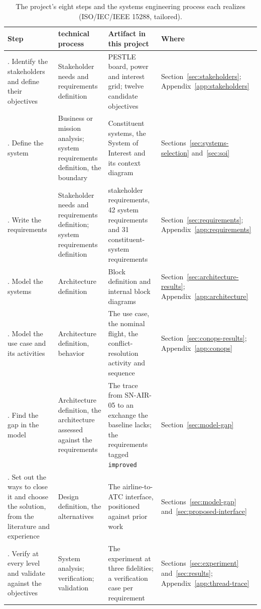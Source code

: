 \begin{table}[htbp]
\centering
\footnotesize
\renewcommand{\arraystretch}{1.25}
\caption{The project's eight steps and the systems engineering process each realizes (ISO/IEC/IEEE 15288, tailored).}
\label{tab:se-processes}
\begin{tabular}{@{}>{\raggedright\arraybackslash}p{3.3cm}>{\raggedright\arraybackslash}p{3.5cm}>{\raggedright\arraybackslash}p{5.3cm}>{\raggedright\arraybackslash}p{3.3cm}@{}}
\toprule
Step & 15288 technical process & Artifact in this project & Where \\
\midrule
1. Identify the stakeholders and define their objectives & Stakeholder needs and requirements definition & PESTLE board, power and interest grid; twelve candidate objectives & Section~\ref{sec:stakeholders}; Appendix~\ref{app:stakeholders} \\
2. Define the system & Business or mission analysis; system requirements definition, the boundary & Constituent systems, the System of Interest and its context diagram & Sections~\ref{sec:systems-selection} and~\ref{sec:soi} \\
3. Write the requirements & Stakeholder needs and requirements definition; system requirements definition & 30 stakeholder requirements, 42 system requirements and 31 constituent-system requirements & Section~\ref{sec:requirements}; Appendix~\ref{app:requirements} \\
4. Model the systems & Architecture definition & Block definition and internal block diagrams & Section~\ref{sec:architecture-results}; Appendix~\ref{app:architecture} \\
5. Model the use case and its activities & Architecture definition, behavior & The use case, the nominal flight, the conflict-resolution activity and sequence & Section~\ref{sec:conops-results}; Appendix~\ref{app:conops} \\
6. Find the gap in the model & Architecture definition, the architecture assessed against the requirements & The trace from SN-AIR-05 to an exchange the baseline lacks; the requirements tagged \texttt{improved} & Section~\ref{sec:model-gap} \\
7. Set out the ways to close it and choose the solution, from the literature and experience & Design definition, the alternatives & The airline-to-ATC interface, positioned against prior work & Sections~\ref{sec:model-gap} and~\ref{sec:proposed-interface} \\
8. Verify at every level and validate against the objectives & System analysis; verification; validation & The experiment at three fidelities; a verification case per requirement & Sections~\ref{sec:experiment} and~\ref{sec:results}; Appendix~\ref{app:thread-trace} \\
\bottomrule
\end{tabular}
\end{table}


